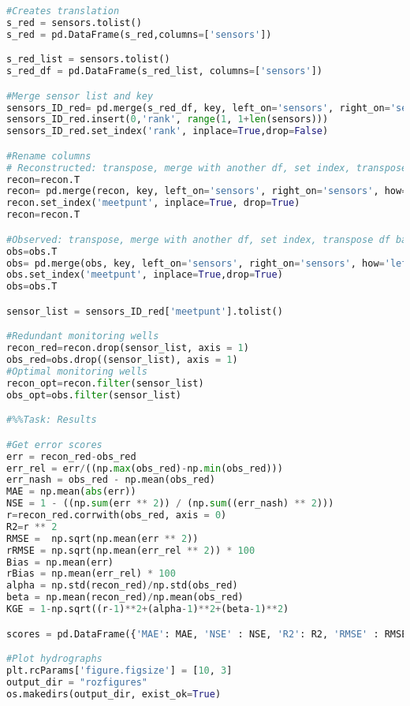 \begin{lstlisting}[language=Python]
#Creates translation
s_red = sensors.tolist()
s_red = pd.DataFrame(s_red,columns=['sensors'])

s_red_list = sensors.tolist()
s_red_df = pd.DataFrame(s_red_list, columns=['sensors'])

#Merge sensor list and key
sensors_ID_red= pd.merge(s_red_df, key, left_on='sensors', right_on='sensors', how='left')
sensors_ID_red.insert(0,'rank', range(1, 1+len(sensors)))
sensors_ID_red.set_index('rank', inplace=True,drop=False)

#Rename columns
# Reconstructed: transpose, merge with another df, set index, transpose df back to original. 
recon=recon.T
recon= pd.merge(recon, key, left_on='sensors', right_on='sensors', how='left')
recon.set_index('meetpunt', inplace=True, drop=True)
recon=recon.T

#Observed: transpose, merge with another df, set index, transpose df back to original. 
obs=obs.T
obs= pd.merge(obs, key, left_on='sensors', right_on='sensors', how='left')
obs.set_index('meetpunt', inplace=True,drop=True)
obs=obs.T

sensor_list = sensors_ID_red['meetpunt'].tolist()

#Redundant monitoring wells 
recon_red=recon.drop(sensor_list, axis = 1)
obs_red=obs.drop((sensor_list), axis = 1)
#Optimal monitoring wells 
recon_opt=recon.filter(sensor_list)
obs_opt=obs.filter(sensor_list)

#%%Task: Results 

#Get error scores
err = recon_red-obs_red
err_rel = err/((np.max(obs_red)-np.min(obs_red)))
err_nash = obs_red - np.mean(obs_red)
MAE = np.mean(abs(err))
NSE = 1 - ((np.sum(err ** 2)) / (np.sum((err_nash) ** 2)))  
r=recon_red.corrwith(obs_red, axis = 0)
R2=r ** 2
RMSE =  np.sqrt(np.mean(err ** 2))
rRMSE = np.sqrt(np.mean(err_rel ** 2)) * 100
Bias = np.mean(err)
rBias = np.mean(err_rel) * 100
alpha = np.std(recon_red)/np.std(obs_red)
beta = np.mean(recon_red)/np.mean(obs_red)
KGE = 1-np.sqrt((r-1)**2+(alpha-1)**2+(beta-1)**2)

scores = pd.DataFrame({'MAE': MAE, 'NSE' : NSE, 'R2': R2, 'RMSE' : RMSE, 'rRMSE' :  rRMSE, 'Bias' : Bias, 'rBias' : rBias, 'KGE' : KGE, 'alpha': alpha, 'beta': beta, 'r_score' :r})

#Plot hydrographs
plt.rcParams['figure.figsize'] = [10, 3]
output_dir = "rozfigures"
os.makedirs(output_dir, exist_ok=True)


\end{lstlisting}
